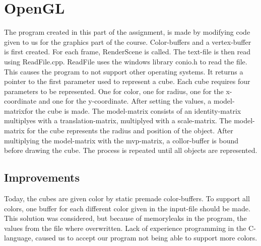 \section{OpenGL}
The program created in this part of the assignment, is made by modifying code given to us for the graphics part of the course. Color-buffers and a vertex-buffer is first created. For each frame, RenderScene is called. The text-file is then read using ReadFile.cpp. ReadFile uses the windows library conio.h to read the file. This causes the program to not support other operating systems. It returns a pointer to the first parameter used to represent a cube. Each cube requires four parameters to be represented. One for color, one for radius, one for the x-coordinate and one for the y-coordinate. After setting the values, a model-matrixfor the cube is made. The model-matrix consists of an identity-matrix multiplyes with a translation-matrix, multiplyed with a scale-matrix. The model-matrix for the cube represents the radius and position of the object. After multiplying the model-matrix with the mvp-matrix, a collor-buffer is bound before drawing the cube. The process is repeated until all objects are represented. 


\subsection{Improvements}
Today, the cubes are given color by static premade color-buffers. To support all colors, one buffer for each different color given in the input-file should be made. This solution was considered, but because of memoryleaks in the program, the values from the file where overwritten. Lack of experience programming in the C-language, caused us to accept our program not being able to support more colors.


